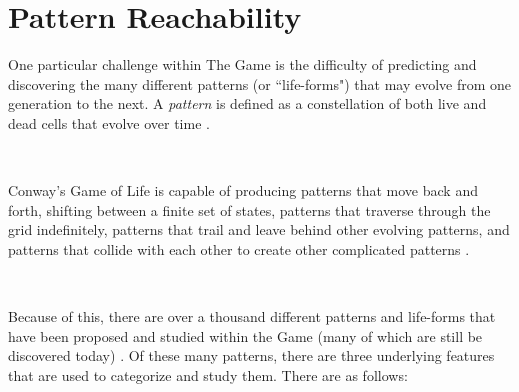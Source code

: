 \documentclass{article}
\theoremstyle{definition}
\theoremstyle{plain}
\theoremstyle{plain}
\begin{document}
\section {Pattern Reachability}
\label{patterns}
One particular challenge within The Game is the difficulty of predicting and discovering the many different patterns (or ``life-forms") that may evolve from one generation to the next. A\textit{ pattern} is defined as a constellation of both live and dead cells that evolve over time \cite{Bontes2019}.

\

Conway's Game of Life is capable of producing patterns that move back and forth, shifting between a finite set of states, patterns that traverse through the grid indefinitely, patterns that trail and leave behind other evolving patterns, and patterns that collide with each other to create other complicated patterns \cite{JG2022conway}.

\

Because of this, there are over a thousand different patterns and life-forms that have been proposed and studied within the Game (many of which are still be discovered today) \cite{Life_Wiki}. Of these many patterns, there are three underlying features that are used to categorize and study them. There are as follows: 
\end{document}
